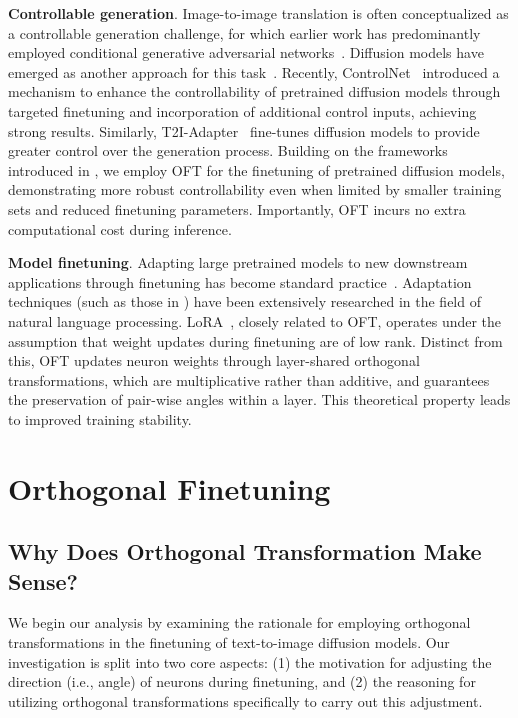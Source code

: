 \textbf{Controllable generation}. Image-to-image translation is often conceptualized as a controllable generation challenge, for which earlier work has predominantly employed conditional generative adversarial networks~\cite{isola2017image,zhu2017toward,wang2018high,park2019semantic,choi2018stargan}. Diffusion models have emerged as another approach for this task~\cite{saharia2022palette,voynov2022sketch,wang2022pretraining}. Recently, ControlNet~\cite{zhang2023adding} introduced a mechanism to enhance the controllability of pretrained diffusion models through targeted finetuning and incorporation of additional control inputs, achieving strong results. Similarly, T2I-Adapter~\cite{mou2023t2i} fine-tunes diffusion models to provide greater control over the generation process. Building on the frameworks introduced in \cite{zhang2023adding,mou2023t2i}, we employ OFT for the finetuning of pretrained diffusion models, demonstrating more robust controllability even when limited by smaller training sets and reduced finetuning parameters. Importantly, OFT incurs no extra computational cost during inference.

\textbf{Model finetuning}. Adapting large pretrained models to new downstream applications through finetuning has become standard practice~\cite{devlin2018bert,brown2020language,he2022masked}. Adaptation techniques (such as those in \cite{hulora2022,houlsby2019parameter,pfeiffer2020adapterfusion}) have been extensively researched in the field of natural language processing. LoRA~\cite{hulora2022}, closely related to OFT, operates under the assumption that weight updates during finetuning are of low rank. Distinct from this, OFT updates neuron weights through layer-shared orthogonal transformations, which are multiplicative rather than additive, and guarantees the preservation of pair-wise angles within a layer. This theoretical property leads to improved training stability.

\section{Orthogonal Finetuning}

\subsection{Why Does Orthogonal Transformation Make Sense?}

We begin our analysis by examining the rationale for employing orthogonal transformations in the finetuning of text-to-image diffusion models. Our investigation is split into two core aspects: (1) the motivation for adjusting the direction (i.e., angle) of neurons during finetuning, and (2) the reasoning for utilizing orthogonal transformations specifically to carry out this adjustment.

